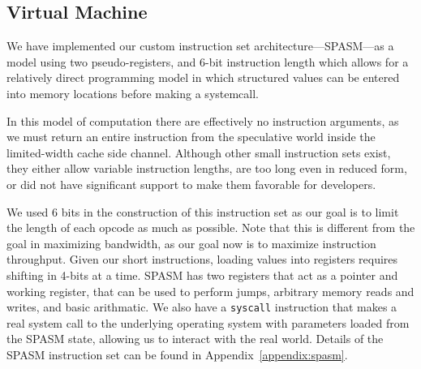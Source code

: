 \subsection{Virtual Machine}
\label{subsec:spasm}


We have implemented our custom instruction set architecture---SPASM---as a model
using two pseudo-registers, and
6-bit instruction length which allows for a relatively direct programming model
in which structured values can be entered into memory locations before making
a systemcall.


%

In this model of computation there are effectively no instruction arguments, as we must
return an entire instruction from the speculative world inside the limited-width
cache side channel. Although other small
instruction sets exist, they either allow variable instruction
lengths, are too long even in reduced form, or did not have significant support
to make them favorable for developers.

We used 6 bits in the construction of this instruction set as our
goal is to limit the length of each opcode as much as possible. Note that this
is different from the goal in maximizing bandwidth, as our goal now is to
maximize instruction throughput. Given our short instructions, loading values into registers
requires shifting in 4-bits at a time. SPASM has two registers that act as a
pointer and working register, that can be used to perform jumps, arbitrary
memory reads and writes, and basic arithmatic. We also have a \texttt{syscall}
instruction that makes a real system call to the underlying operating system
with parameters loaded from the SPASM state, allowing us to interact with the
real world. Details of
the SPASM instruction set can be found in Appendix~\ref{appendix:spasm}. 

